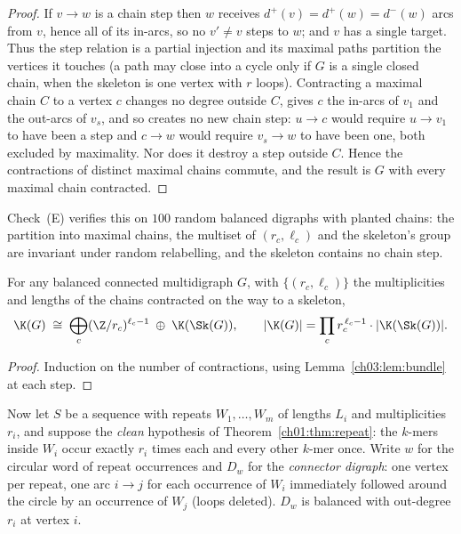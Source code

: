 \begin{proof}
If $v\to w$ is a chain step then $w$ receives $d^+(v)=d^+(w)=d^-(w)$ arcs from $v$, hence
all of its in-arcs, so no $v'\ne v$ steps to $w$; and $v$ has a single target. Thus the
step relation is a partial injection and its maximal paths partition the vertices it
touches (a path may close into a cycle only if $G$ is a single closed chain, when the
skeleton is one vertex with $r$ loops). Contracting a maximal chain $C$ to a vertex $c$
changes no degree outside $C$, gives $c$ the in-arcs of $v_1$ and the out-arcs of $v_s$,
and so creates no new chain step: $u\to c$ would require $u\to v_1$ to have been a step
and $c\to w$ would require $v_s\to w$ to have been one, both excluded by maximality. Nor
does it destroy a step outside $C$. Hence the contractions of distinct maximal chains
commute, and the result is $G$ with every maximal chain contracted.
\end{proof}

Check~(E) verifies this on $100$ random balanced digraphs with planted chains: the
partition into maximal chains, the multiset of $(r_c,\ell_c)$ and the skeleton's group are
invariant under random relabelling, and the skeleton contains no chain step.

\begin{theorem}[Splitting]\label{ch03:thm:split}
For any balanced connected multidigraph $G$, with $\{(r_c,\ell_c)\}$ the multiplicities
and lengths of the chains contracted on the way to a skeleton,
\[
\K(G)\;\cong\;\bigoplus_c(\Z/r_c)^{\ell_c-1}\;\oplus\;\K(\Sk(G)),
\qquad
|\K(G)|=\prod_c r_c^{\,\ell_c-1}\cdot|\K(\Sk(G))|.
\]
\end{theorem}

\begin{proof}
Induction on the number of contractions, using Lemma~\ref{ch03:lem:bundle} at each step.
\end{proof}

Now let $S$ be a sequence with repeats $W_1,\dots,W_m$ of lengths $L_i$ and
multiplicities $r_i$, and suppose the \emph{clean} hypothesis of Theorem~\ref{ch01:thm:repeat}: the $k$-mers
inside $W_i$ occur exactly $r_i$ times each and every other $k$-mer once. Write $w$ for
the circular word of repeat occurrences and $D_w$ for the \emph{connector digraph}: one
vertex per repeat, one arc $i\to j$ for each occurrence of $W_i$ immediately followed
around the circle by an occurrence of $W_j$ (loops deleted). $D_w$ is balanced with
out-degree $r_i$ at vertex $i$.

